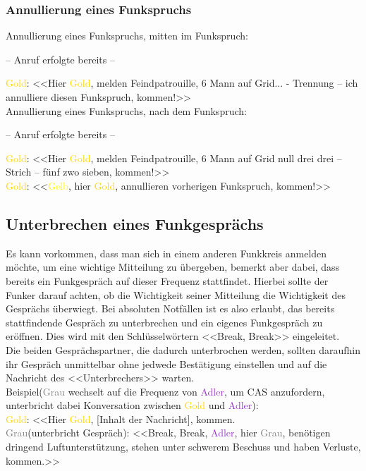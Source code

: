 \subsubsection{Annullierung eines Funkspruchs}
Annullierung eines Funkspruchs, mitten im Funkspruch: \\
\begin{center}
– Anruf erfolgte bereits –
\end{center}
\textcolor{gold}{Gold}: <<Hier \textcolor{gold}{Gold}, melden Feindpatrouille, 6 Mann auf Grid... - Trennung – ich annulliere diesen Funkspruch, kommen!>> \\
Annullierung eines Funkspruchs, nach dem Funkspruch: \\
\begin{center}
– Anruf erfolgte bereits – \\
\end{center}
\textcolor{gold}{Gold}: <<Hier \textcolor{gold}{Gold}, melden Feindpatrouille, 6 Mann auf Grid null drei drei – Strich – fünf zwo sieben, kommen!>> \\
\textcolor{gold}{Gold}: <<\textcolor{yellow}{Gelb}, hier \textcolor{gold}{Gold}, annullieren vorherigen Funkspruch, kommen!>> \\

\subsection{Unterbrechen eines Funkgesprächs}
Es kann vorkommen, dass man sich in einem anderen Funkkreis anmelden möchte, um eine wichtige Mitteilung zu übergeben, bemerkt aber dabei, dass bereits ein Funkgespräch auf dieser Frequenz stattfindet. Hierbei sollte der Funker darauf achten, ob die Wichtigkeit seiner Mitteilung die Wichtigkeit des Gesprächs überwiegt. Bei absoluten Notfällen ist es also erlaubt, das bereits stattfindende Gespräch zu unterbrechen und ein eigenes Funkgespräch zu eröffnen. Dies wird mit den Schlüsselwörtern <<Break, Break>> eingeleitet. \\
Die beiden Gesprächspartner, die dadurch unterbrochen werden, sollten daraufhin ihr Gespräch unmittelbar ohne jedwede Bestätigung einstellen und auf die Nachricht des <<Unterbrechers>> warten. \\
Beispiel(\textcolor{gray}{Grau} wechselt auf die Frequenz von \textcolor{DarkOrchid}{Adler}, um CAS anzufordern, unterbricht dabei Konversation zwischen \textcolor{gold}{Gold} und \textcolor{DarkOrchid}{Adler}):\\
\textcolor{gold}{Gold}: <<Hier \textcolor{gold}{Gold}, [Inhalt der Nachricht], kommen. \\
\textcolor{gray}{Grau}(unterbricht Gespräch): <<Break, Break, \textcolor{DarkOrchid}{Adler}, hier \textcolor{gray}{Grau}, benötigen dringend Luftunterstützung, stehen unter schwerem Beschuss und haben Verluste, kommen.>>  \\

